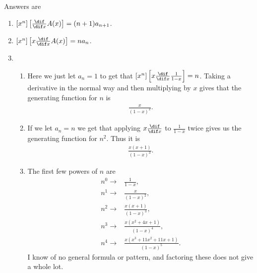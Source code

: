 \begin{enumerate}
    Answers are
    \begin{enumerate}
        \item $[x^n] \left[ \frac{\dif}{\dif x} A(x) \right] = (n+1) a_{n+1}$.
        \item $[x^n] \left[ x \frac{\dif }{\dif x} A(x)  \right] = n a_n $.
        \item 
        \begin{enumerate}
            \item Here we just let $a_n = 1$ to get that $[x^n] \left[ x \frac{\dif }{\dif x} \frac{1}{1-x}  \right] = n$. Taking a derivative in the normal way and then multiplying by $x$ gives that the generating function for $n$ is
            \begin{align*}
                \frac{x}{(1-x)^2}.
            \end{align*}
            \item If we let $a_n = n$ we get that applying $x \frac{\dif}{\dif x}$ to $\frac{1}{1-x}$ twice gives us the generating function for $n^2$. Thus it is
            \begin{align*}
                \frac{x(x+1)}{(1-x)^3}.
            \end{align*}
            \item The first few powers of $n$ are
            \begin{align*}
            n^0\to &\frac{1}{1-x},\\
            n^1\to &\frac{x}{(1-x)^2},\\
            n^2\to &\frac{x(x+1)}{(1-x)^3},\\
            n^3\to &\frac{x(x^2 + 4x+1)}{(1-x)^4},\\
            n^4\to &\frac{x(x^3 + 11x^2 + 11x +1)}{(1-x)^5}.
            \end{align*}
            I know of no general formula or pattern, and factoring these does not give a whole lot.
        \end{enumerate}
    \end{enumerate}
\end{enumerate}